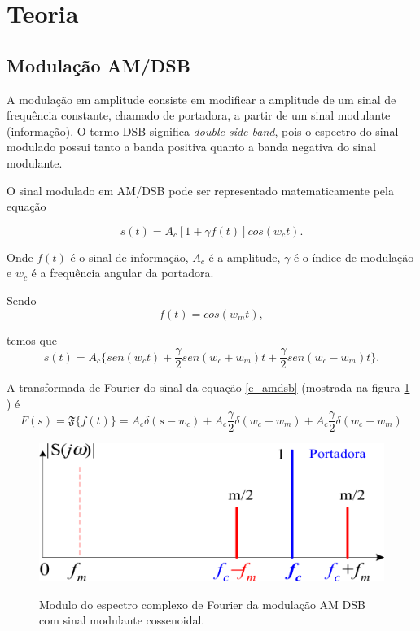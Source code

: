 \newpage
\section{Teoria}
\subsection{Modulação AM/DSB}
A modulação em amplitude consiste em modificar a amplitude de um sinal de frequência constante, chamado de portadora, a partir de um sinal modulante (informação). O termo DSB significa \textit{double side band}, pois o espectro do sinal modulado possui tanto a banda positiva quanto a banda negativa do sinal modulante.

O sinal modulado em AM/DSB pode ser representado matematicamente pela equação

\begin{equation}
s(t) = A_c[1+\gamma f(t)]cos(w_c t).
\label{e_am}
\end{equation}

Onde $f(t)$ é o sinal de informação, $A_c$ é a amplitude, $\gamma$ é o índice de modulação e $w_c$ é a frequência angular da portadora.

Sendo 
\[ f(t) = cos(w_m t), \]

temos que
\begin{equation}
s(t) = A_c  \bigg \{ sen(w_c t) + \frac{\gamma}{2}sen(w_c + w_m)t + \frac{\gamma}{2}sen(w_c - w_m)t \bigg  \} .
\label{e_amdsb}
\end{equation}

A transformada de Fourier do sinal da equação \ref{e_amdsb} (mostrada na figura \ref{f_fourier_am_dsb} ) é 
\[
F(s) = \mathfrak{F} \big \{ f(t) \big \} = A_c \delta (s - w_c) + A_c \frac{\gamma}{2}\delta(w_c  + w_m) + A_c \frac{\gamma}{2}\delta(w_c  - w_m)
\]

\begin{figure}[H]
    \centering
    \caption{Modulo do espectro complexo de Fourier da modulação AM DSB com sinal modulante cossenoidal.}
    \includegraphics[scale=0.3]{Imagens/fourier_am_dsb.png}
    \label{f_fourier_am_dsb}
\end{figure}


